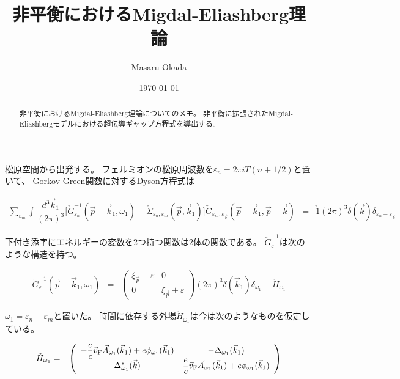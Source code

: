 \documentclass[uplatex,a4j,12pt,dvipdfmx]{jsarticle}
\title{非平衡におけるMigdal-Eliashberg理論}
\author{Masaru Okada}
\date{\today}
\begin{document}
\maketitle

\begin{abstract}
	非平衡におけるMigdal-Eliashberg理論についてのメモ。
	非平衡に拡張されたMigdal-Eliashbergモデルにおける超伝導ギャップ方程式を導出する。
\end{abstract}

松原空間から出発する。
フェルミオンの松原周波数を$\varepsilon_{n} = 2 \pi i T (n + 1/2)$と置いて、
Gorkov Green関数に対するDyson方程式は

\begin{eqnarray}
	\sum_{\varepsilon_{m}}
	\int \dfrac{ d^{3} \vec{k}_{1} }{ (2 \pi)^{3} }
	\Big[ \check{G}^{-1}_{\varepsilon_{n}} (\vec{p} - \vec{k}_{1} , \omega_{1} ) - \check{\mathit{\Sigma}}_{\varepsilon_{n},\varepsilon_{m}}(\vec{p},\vec{k}_{1}) \Big]
	\check{G}_{\varepsilon_{m},\varepsilon_{\vec{k}}} ( \vec{p} - \vec{k}_{1} , \vec{p} - \vec{k} )
	&=&
	\check{1} (2 \pi)^{3} \delta(\vec{k}) \delta_{\varepsilon_{n} - \varepsilon_{\vec{k}}}
	\label{eqn:dysonone}
\end{eqnarray}

下付き添字にエネルギーの変数を2つ持つ関数は2体の関数である。
$\check{G}^{-1}_{\varepsilon}$は次のような構造を持つ。

\begin{eqnarray}
	\check{G}^{-1}_{\varepsilon}(\vec{p}-\vec{k}_{1},\omega_{1})
	&=&
	\left(
	\begin{array}{cc}
		\xi_{\vec{p}} - \varepsilon & 0
		\\
		0                           & \xi_{\vec{p}} + \varepsilon
	\end{array}
	\right)
	(2 \pi)^{3}
	\delta(\vec{k}_{1})
	\delta_{\omega_{1}}
	+
	\check{H}_{\omega_{1}}
\end{eqnarray}

$\omega_{1} = \varepsilon_{n} - \varepsilon_{m}$と置いた。
時間に依存する外場$\check{H}_{\omega_{1}}$は今は次のようなものを仮定している。

\begin{eqnarray}
	\check{H}_{\omega_{1}}
	&=&
	\left(
	\begin{array}{cc}
			- \dfrac{e}{c} \vec{v}_{\rm F} \vec{A}_{\omega_{1}} (\vec{k}_{1}) + e \phi_{\omega_{1}}(\vec{k}_{1}) & - \Delta_{\omega_{1}} (\vec{k}_{1})
			\\
			\Delta^{*}_{\omega_{1}} (\vec{k})                                                                    & \dfrac{e}{c} \vec{v}_{\rm F} \vec{A}_{\omega_{1}} (\vec{k}_{1}) + e \phi_{\omega_{1}} (\vec{k}_{1})
		\end{array}
	\right)
\end{eqnarray}
\end{document}
